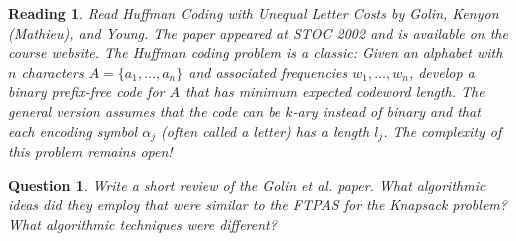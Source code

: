 \documentclass[11pt]{article}
\newtheorem{question}{Question}
\newtheorem{reading}{Reading}
\begin{document}
\begin{reading}
Read {\em Huffman Coding with Unequal Letter Costs} by Golin, Kenyon (Mathieu), and Young.  The paper appeared at STOC 2002 and is available on the course website.  The Huffman coding problem is a classic:  Given an alphabet with $n$ characters $A=\{a_{1}, \ldots, a_{n}\}$ and associated frequencies $w_{1}, \ldots, w_{n}$, develop a binary prefix-free code for $A$ that has minimum expected codeword length.  The general version assumes that the code can be $k$-ary instead of binary and that each encoding symbol $\alpha_{j}$ (often called a {\em letter}) has a length $l_{j}$.  The complexity of this problem remains open!
\end{reading}

\begin{question}
Write a short review of the Golin et al. paper.  What algorithmic ideas did they employ that were similar to the FTPAS for the {\sc Knapsack} problem?  What algorithmic techniques were different?
\end{question}
\end{document}
